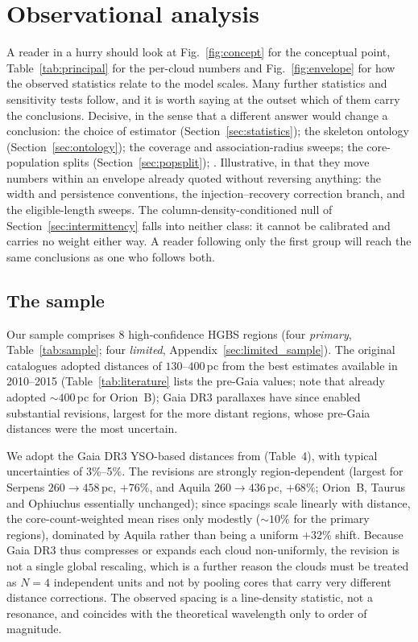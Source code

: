 \documentclass[usenatbib,twoside,twocolumn]{mnras}
\begin{document}
\section{Observational analysis}

\noindent A reader in a hurry should look at Fig.~\ref{fig:concept} for the conceptual point, Table~\ref{tab:principal} for the per-cloud numbers and Fig.~\ref{fig:envelope} for how the observed statistics relate to the model scales. Many further statistics and sensitivity tests follow, and it is worth saying at the outset which of them carry the conclusions. Decisive, in the sense that a different answer would change a conclusion: the choice of estimator (Section~\ref{sec:statistics}); the skeleton ontology (Section~\ref{sec:ontology}); the coverage and association-radius sweeps; the core-population splits (Section~\ref{sec:popsplit}); . Illustrative, in that they move numbers within an envelope already quoted without reversing anything: the width and persistence conventions, the injection--recovery correction branch, and the eligible-length sweeps. The column-density-conditioned null of Section~\ref{sec:intermittency} falls into neither class: it cannot be calibrated and carries no weight either way. A reader following only the first group will reach the same conclusions as one who follows both.

\subsection{The sample}

Our sample comprises 8 high-confidence HGBS regions (four \emph{primary}, Table~\ref{tab:sample}; four \emph{limited}, Appendix~\ref{sec:limited_sample}). The original catalogues \citep{Konyves2015, Konyves2020, Ladjelate2020, Pezzuto2021} adopted distances of $130$--$400$\,pc from the best estimates available in 2010--2015 (Table~\ref{tab:literature} lists the pre-Gaia values; note that \citealt{Konyves2020} already adopted $\sim400$\,pc for Orion~B); Gaia DR3 parallaxes \citep{Zhang2023} have since enabled substantial revisions, largest for the more distant regions, whose pre-Gaia distances were the most uncertain.

We adopt the Gaia DR3 YSO-based distances from \citet{Zhang2023} (Table~4), with typical uncertainties of 3\%--5\%. The revisions are strongly region-dependent (largest for Serpens $260\to458$\,pc, $+76\%$, and Aquila $260\to436$\,pc, $+68\%$; Orion~B, Taurus and Ophiuchus essentially unchanged); since spacings scale linearly with distance, the core-count-weighted mean rises only modestly ($\sim10\%$ for the primary regions), dominated by Aquila rather than being a uniform $+32\%$ shift. Because Gaia DR3 thus compresses or expands each cloud non-uniformly, the revision is not a single global rescaling, which is a further reason the clouds must be treated as $N=4$ independent units  and not by pooling cores that carry very different distance corrections. The observed spacing is a line-density statistic, not a resonance, and coincides with the theoretical wavelength only to order of magnitude.
\end{document}
